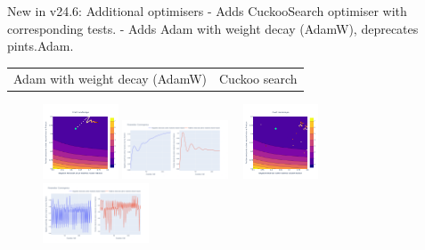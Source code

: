 \documentclass[aspectratio=169]{beamer}
\begin{document}
\begin{frame}[fragile,t]{New in v24.6: Additional optimisers}
    \vspace{-6mm}
     - Adds CuckooSearch optimiser with corresponding tests.
     - Adds Adam with weight decay (AdamW), deprecates pints.Adam.

    \begin{table}[]
        \centering
        \footnotesize
    \begin{tabularx}{0.86\textwidth}{*{2}{Y}}
         Adam with weight decay (AdamW) &
         Cuckoo search
    \end{tabularx}
    \end{table}
    \vspace{-6mm}
    \begin{figure}
        \centering
        \includegraphics[width=0.2\textwidth]{Images/Optimisers/adamw_cost.png}
        \includegraphics[width=0.28\textwidth]{Images/Optimisers/adamw_params.png} ~
        \includegraphics[width=0.2\textwidth]{Images/Optimisers/cuckoo_cost.png}
        \includegraphics[width=0.28\textwidth]{Images/Optimisers/cuckoo_params.png}
        \label{fig:optimisersNew}
    \end{figure}
\end{frame}
\end{document}
